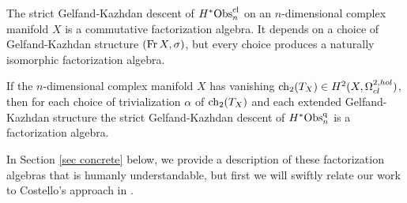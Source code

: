 \begin{cor}
The strict Gelfand-Kazhdan descent of $H^*{\rm Obs}^{\rm cl}_n$ on an $n$-dimensional complex manifold $X$ 
is a commutative factorization algebra.
It depends on a choice of Gelfand-Kazhdan structure $({\rm Fr}\, X, \sigma)$,
but every choice produces a naturally isomorphic factorization algebra.

If the $n$-dimensional complex manifold $X$ has vanishing ${\rm ch}_2(T_X) \in H^2(X, \Omega^{2,hol}_{cl})$,
then for each choice of trivialization $\alpha$ of ${\rm ch}_2(T_X)$ and each extended Gelfand-Kazhdan structure
the strict Gelfand-Kazhdan descent of $H^*{\rm Obs}^{\rm q}_n$ is a factorization algebra.
\end{cor}

In Section \ref{sec concrete} below, we provide a description of these
factorization algebras that is humanly understandable,
but first we will swiftly relate our work to Costello's approach in \cite{WG2}.

